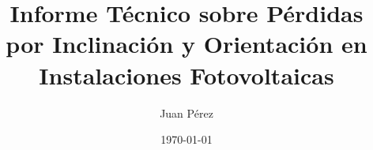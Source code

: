 \newcommand{\titulo}{titulo del documento}
\title{Informe Técnico sobre Pérdidas por Inclinación y Orientación en Instalaciones Fotovoltaicas}
\author{Juan Pérez}
\date{\today}


\newcommand{\figuraDatosCSV}{
\subsection{Ilustraciones o tablas suplementarias.}
\begin{figure}[ht]
    \centering
    \begin{tikzpicture}[scale=.63]
        \begin{axis}[
            xlabel={Eje X},
            ylabel={Eje Y},
            grid=both,
            xtick=\empty, %
            ytick=\empty  %
        ]
            \addplot+[ybar] table[x=x, y=y] {\misdatos};
            \addplot+ {1/sqrt(2*pi)*exp(-x^2/2)};
        \end{axis}
    \end{tikzpicture}
    \caption{Una figura de ejemplo} %
\end{figure}
}


